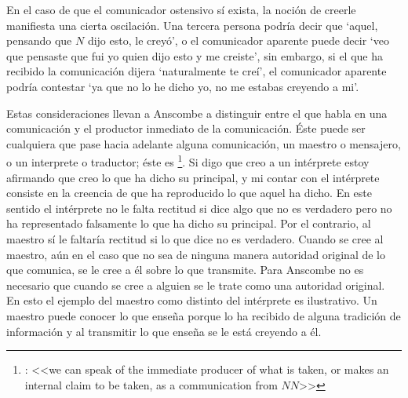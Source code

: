 En el caso de que el comunicador ostensivo sí exista, la noción de creerle manifiesta una cierta oscilación. Una tercera persona podría decir que `aquel, pensando que $N$ dijo esto, le creyó', o el comunicador aparente puede decir `veo que pensaste que fui yo quien dijo esto y me creiste', sin embargo, si el que ha recibido la comunicación dijera `naturalmente te creí', el comunicador aparente podría contestar `ya que no lo he dicho yo, no me estabas creyendo a mi'\autocite[Cf.~][8]{anscombe2008faith:tobelieve}.

Estas consideraciones llevan a Anscombe a distinguir entre el que habla en una comunicación y el productor inmediato de la comunicación\autocite[Cf.~][8]{anscombe2008faith:tobelieve}. Éste puede ser cualquiera que pase hacia adelante alguna comunicación, un maestro o mensajero, o un interprete o traductor; éste es \footnote{\cite[8]{anscombe2008faith:tobelieve}: <<we can speak of the immediate producer of what is taken, or makes an internal claim to be taken, as a communication from $NN$>>}. Si digo que creo a un intérprete estoy afirmando que creo lo que ha dicho su principal, y mi contar con el intérprete consiste en la creencia de que ha reproducido lo que aquel ha dicho. En este sentido el intérprete no le falta rectitud si dice algo que no es verdadero pero no ha representado falsamente lo que ha dicho su principal. Por el contrario, al maestro sí le faltaría rectitud si lo que dice no es verdadero. Cuando se cree al maestro, aún en el caso que no sea de ninguna manera autoridad original de lo que comunica, se le cree a él sobre lo que transmite. Para Anscombe no es necesario que cuando se cree a alguien se le trate como una autoridad original\autocite[Cf.~][5]{anscombe2008faith:tobelieve}. En esto el ejemplo del maestro como distinto del intérprete es ilustrativo. Un maestro puede conocer lo que enseña porque lo ha recibido de alguna tradición de información y al transmitir lo que enseña se le está creyendo a él.

